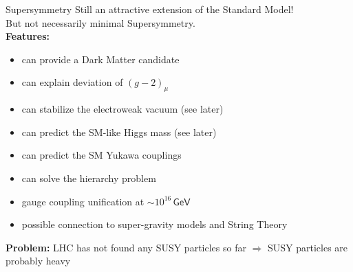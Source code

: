 \documentclass[hyperref={pdfpagelabels=false},ngerman]{beamer}
\newcommand{\eh}[1]{\,\mathsf{#1}}
\newcommand{\ESSM}{E\textsubscript{6}SSM}
\renewcommand{\emph}{\textbf}
\begin{document}
\begin{frame}{Supersymmetry}
  Still an attractive extension of the Standard Model! \\
  But not necessarily minimal Supersymmetry.\\[1em]
  \emph{Features:}
  \begin{itemize}
  \item can provide a Dark Matter candidate
  \item can explain deviation of $(g-2)_\mu$
  \item can stabilize the electroweak vacuum (see later)
  \item can predict the SM-like Higgs mass (see later)
  \item can predict the SM Yukawa couplings
  \item can solve the hierarchy problem
  \item gauge coupling unification at $\sim 10^{16}\eh{GeV}$
  \item possible connection to super-gravity models and String Theory
  \end{itemize}
  \vspace{1em}
  \emph{Problem:} LHC has not found any SUSY particles so far
  $\Rightarrow$ SUSY particles are probably heavy
\end{frame}
\end{document}
